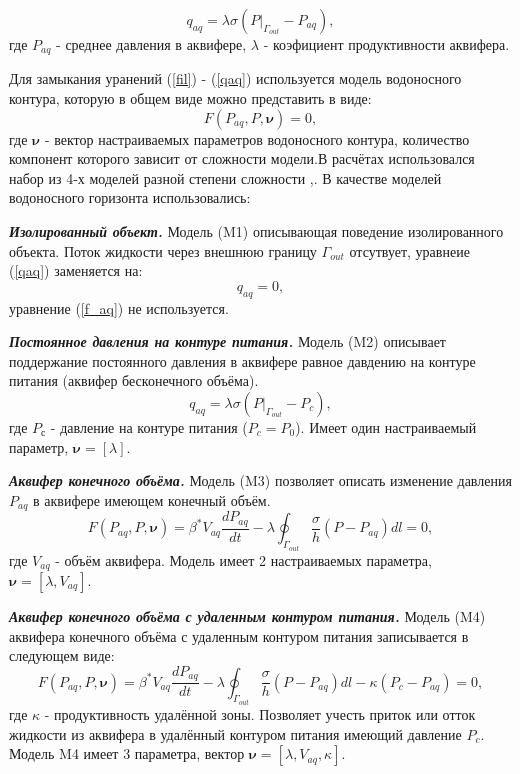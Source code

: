 \documentclass{article}
\begin{document}
\begin{equation} \label{qaq}
q_{aq} = \lambda\sigma(P|_{\Gamma_{out}}-P_{aq}),
\end{equation}
где $P_{aq}$ - среднее давления в аквифере, $\lambda$ - коэфициент продуктивности аквифера.

Для замыкания уранений (\ref{fil}) - (\ref{qaq}) используется модель водоносного контура, которую в общем виде можно представить в виде: 
\begin{equation} \label{f_aq}
F(P_{aq}, P,\boldsymbol{\nu})=0,
\end{equation}
где $\boldsymbol{\nu}$ - вектор настраиваемых параметров водоносного контура, количество компонент которого зависит от сложности модели.В расчётах использовался набор из 4-х моделей разной степени сложности \cite{dake},\cite{fet}. В качестве моделей водоносного горизонта использовались:

\textbf{\textit{Изолированный объект.}}
Модель (M1) описывающая поведение изолированного объекта. Поток жидкости через внешнюю границу $\Gamma_{out}$ отсутвует, уравнеие (\ref{qaq}) заменяется на:
\begin{equation}
q_{aq}=0,
\end{equation}
уравнение (\ref{f_aq}) не используется.

\textbf{\textit{Постоянное давления на контуре питания.}}
Модель (M2) описывает поддержание постоянного давления в аквифере равное давдению на контуре питания (аквифер бесконечного объёма). 
\begin{equation}
q_{aq} = \lambda\sigma(P|_{\Gamma_{out}}-P_c),
\end{equation}
где $P_с$ - давление на контуре питания ($P_c = P_0$). Имеет один настраиваемый параметр, $\boldsymbol{\nu} = [\lambda]$.

\textbf{\textit{Аквифер конечного объёма.}}
Модель (M3) позволяет описать изменение давления $P_{aq}$ в аквифере имеющем конечный объём. 
\begin{equation}
F(P_{aq}, P,\boldsymbol{\nu})=\beta^*V_{aq}\frac{dP_{aq}}{dt} - \lambda\oint_{\Gamma_{out}}\frac{\sigma}{h}(P-P_{aq})dl = 0,
\end{equation}
где $V_{aq}$ - объём аквифера. Модель имеет 2 настраиваемых параметра, $\boldsymbol{\nu} = [\lambda, V_{aq}]$.

\textbf{\textit{Аквифер конечного объёма с удаленным контуром питания.}}
Модель (M4) аквифера конечного объёма с удаленным контуром питания записывается в следующем виде: 
\begin{equation}
F(P_{aq}, P,\boldsymbol{\nu})=\beta^*V_{aq}\frac{dP_{aq}}{dt} -\lambda\oint_{\Gamma_{out}}\frac{\sigma}{h}(P-P_{aq})dl - \kappa(P_c - P_{aq})=0,
\end{equation}
где $\kappa$ - продуктивность удалённой зоны. Позволяет учесть приток или отток жидкости из аквифера в удалённый контуром питания имеющий давление $P_{c}$. Модель M4 имеет 3 параметра, вектор $\boldsymbol{\nu} = [\lambda, V_{aq}, \kappa]$.
\end{document}
